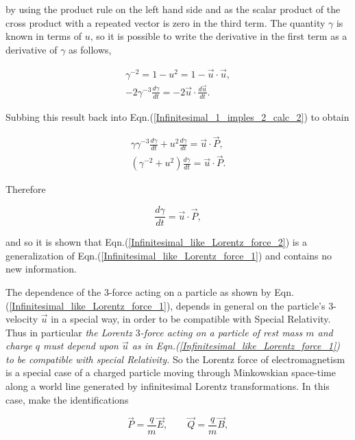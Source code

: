 \noindent by using the product rule on the left hand side and as the scalar product of the cross product with a repeated vector is zero in the third term. The quantity $\gamma$ is known in terms of $u$, so it is possible to write the derivative in the first term as a derivative of $\gamma$ as follows,

\begin{gather*} 
\gamma^{-2} = 1 - u^{2} = 1- \vec{u} \cdot \vec{u}, \\
-2 \gamma^{-3} \frac{d\gamma}{dt} = - 2 \vec{u} \cdot \frac{d \vec{u}}{dt}.
\end{gather*}

\noindent Subbing this result back into Eqn.(\ref{Infinitesimal_1_imples_2_calc_2}) to obtain

\begin{gather*} 
\gamma \gamma^{-3} \frac{d\gamma}{dt} + u^2 \frac{d\gamma}{dt} = \vec{u} \cdot \vec{P}, \\
(\gamma^{-2} + u^2) \frac{d\gamma}{dt} = \vec{u} \cdot \vec{P}.
\end{gather*} 

\noindent Therefore

\begin{equation*}
\frac{d\gamma}{dt} =  \vec{u} \cdot \vec{P},
\end{equation*}

\noindent and so it is shown that Eqn.(\ref{Infinitesimal_like_Lorentz_force_2}) is a generalization of Eqn.(\ref{Infinitesimal_like_Lorentz_force_1}) and contains no new information. 

The dependence of the $3$-force acting on a particle as shown by Eqn.(\ref{Infinitesimal_like_Lorentz_force_1}), depends in general on the particle's $3$-velocity $\vec{u}$ in a special way, in order to be compatible with Special Relativity. Thus in particular \textit{the Lorentz $3$-force acting on a particle of rest mass $m$ and charge $q$ must depend upon $\vec{u}$ as in Eqn.(\ref{Infinitesimal_like_Lorentz_force_1}) to be compatible with special Relativity.} So the Lorentz force of electromagnetism is a special case of a charged particle moving through Minkowskian space-time along a world line generated by infinitesimal Lorentz transformations. In this case, make the identifications

\begin{equation}\label{Infinitesimal_P_Q_interms_E_B} 
\vec{P} = \frac{q}{m} \vec{E}, \qquad \vec{Q} = \frac{q}{m}\vec{B},
\end{equation} 


